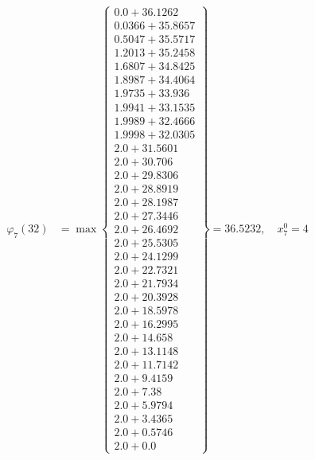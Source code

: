 \documentclass{article}
\begin{document}
\begin{align*}
  
\varphi_{7}(32) &= \max \left\{ \begin{array}{c}
0.0 + 36.1262 \\
 0.0366 + 35.8657 \\
 0.5047 + 35.5717 \\
 1.2013 + 35.2458 \\
 1.6807 + 34.8425 \\
 1.8987 + 34.4064 \\
 1.9735 + 33.936 \\
 1.9941 + 33.1535 \\
 1.9989 + 32.4666 \\
 1.9998 + 32.0305 \\
 2.0 + 31.5601 \\
 2.0 + 30.706 \\
 2.0 + 29.8306 \\
 2.0 + 28.8919 \\
 2.0 + 28.1987 \\
 2.0 + 27.3446 \\
 2.0 + 26.4692 \\
 2.0 + 25.5305 \\
 2.0 + 24.1299 \\
 2.0 + 22.7321 \\
 2.0 + 21.7934 \\
 2.0 + 20.3928 \\
 2.0 + 18.5978 \\
 2.0 + 16.2995 \\
 2.0 + 14.658 \\
 2.0 + 13.1148 \\
 2.0 + 11.7142 \\
 2.0 + 9.4159 \\
 2.0 + 7.38 \\
 2.0 + 5.9794 \\
 2.0 + 3.4365 \\
 2.0 + 0.5746 \\
 2.0 + 0.0
\end{array} \right\}=36.5232,\quad x_{7}^0=4\\
  
  
  

\end{align*}
\end{document}
